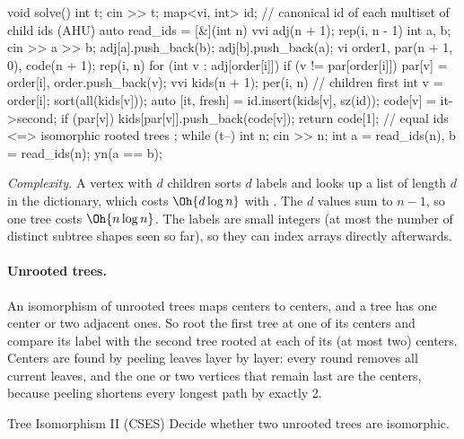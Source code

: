 \begin{code}
void solve() {
    int t;
    cin >> t;
    map<vi, int> id;  // canonical id of each multiset of child ids (AHU)
    auto read_ids = [&](int n) {
        vvi adj(n + 1);
        rep(i, n - 1) {
            int a, b;
            cin >> a >> b;
            adj[a].push_back(b);
            adj[b].push_back(a);
        }
        vi order{1}, par(n + 1, 0), code(n + 1);
        rep(i, n) for (int v : adj[order[i]])
            if (v != par[order[i]]) par[v] = order[i], order.push_back(v);
        vvi kids(n + 1);
        per(i, n) {  // children first
            int v = order[i];
            sort(all(kids[v]));
            auto [it, fresh] = id.insert({kids[v], sz(id)});
            code[v] = it->second;
            if (par[v]) kids[par[v]].push_back(code[v]);
        }
        return code[1];  // equal ids <=> isomorphic rooted trees
    };
    while (t--) {
        int n;
        cin >> n;
        int a = read_ids(n), b = read_ids(n);
        yn(a == b);
    }
}
\end{code}

\emph{Complexity.} A vertex with $d$ children sorts $d$ labels and looks up a list of length $d$ in the dictionary, which costs
$\Oh{d \log n}$ with . The $d$ values sum to $n - 1$, so one tree costs $\Oh{n \log n}$. The labels are small
integers (at most the number of distinct subtree shapes seen so far), so they can index arrays directly afterwards.

\paragraph{Unrooted trees.} An isomorphism of unrooted trees maps centers to centers, and a tree has one center or two adjacent ones.
So root the first tree at one of its centers and compare its label with the second tree rooted at each of its (at most two) centers.
Centers are found by peeling leaves layer by layer: every round removes all current leaves, and the one or two vertices that remain
last are the centers, because peeling shortens every longest path by exactly 2.

\begin{problem}{Tree Isomorphism II (CSES)}
Decide whether two unrooted trees are isomorphic.
\end{problem}

